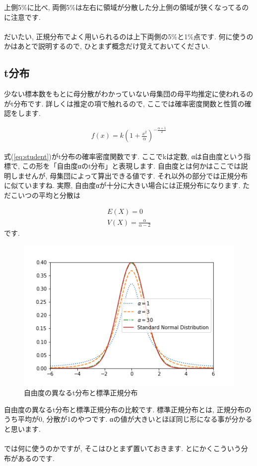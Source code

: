 \documentclass[11pt,a4paper]{jsarticle}                    %
\begin{document}
上側5\%に比べ, 両側5\%は左右に領域が分散した分上側の領域が狭くなってるのに注意です. \\
\\
だいたい, 正規分布でよく用いられるのは上下両側の5\%と1\%点です. 何に使うのかはあとで説明するので, ひとまず概念だけ覚えておいてください.

\subsection{t分布}
少ない標本数をもとに母分散がわかっていない母集団の母平均推定に使われるのがt分布です. 詳しくは推定の項で触れるので, ここでは確率密度関数と性質の確認をします.

\begin{eqnarray}
\label{eq:student}
f(x) = k(1 + \frac{x^2}{\alpha})^{-\frac{\alpha+1}{2}}
\end{eqnarray}

式(\ref{eq:student})がt分布の確率密度関数です. ここでkは定数, αは自由度という指標で, この形を「自由度αのt分布」と表現します. 自由度とは何かはここでは説明しませんが, 母集団によって算出できる値です. それ以外の部分では正規分布に似ていますね. 実際, 自由度αが十分に大きい場合には正規分布になります. ただこいつの平均と分散は

\begin{eqnarray}
E(X) = 0\\
V(X) = \frac{\alpha}{\alpha-2}
\end{eqnarray}
です. 

\begin{figure}[H]
\label{im:student}
  \centering
  \includegraphics[width=120mm,bb=0 0 432 288]{figures/student.png}
  \caption{自由度の異なるt分布と標準正規分布}
\end{figure}
自由度の異なるt分布と標準正規分布の比較です. 標準正規分布とは, 正規分布のうち平均が0, 分散が1のやつです. αの値が大きいとほぼ同じ形になる事が分かると思います.\\
\\
では何に使うのかですが, そこはひとまず置いておきます. とにかくこういう分布があるのです.
\end{document}
